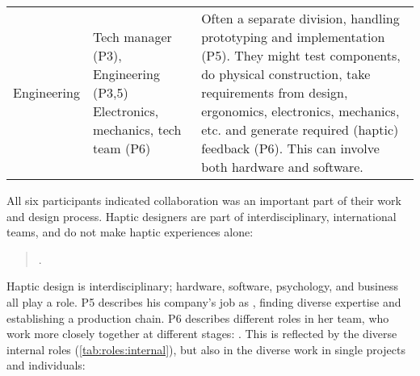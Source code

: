 \begin{table}[tbp]
{\begin{tabular}{p{0.5in}p{1.1in}p{2.75in}}
        
        Engineering 
            &
            Tech manager (P3), \newline
            Engineering (P3,5) \newline
            Electronics, mechanics, tech team (P6) \newline
            & Often a separate division, handling prototyping and implementation (P5).
            They might test components, do %
            physical construction, take requirements from design, ergonomics, electronics, mechanics, etc. and generate required (haptic) feedback (P6).
            This can involve both hardware and software.
            \\ %
      \end{tabular}}
    \end{table}
    
All six participants indicated collaboration was an important part of their work and design process.
Haptic designers are part of interdisciplinary, international teams, and do not make haptic experiences alone:

\begin{quote}
    .
\end{quote}


Haptic design is interdisciplinary; hardware, software, psychology, and business all play a role.
P5 describes his company's job as , finding diverse expertise and establishing a production chain.
P6 describes different roles in her team, who work more closely together at different stages: .
This is reflected by the diverse internal roles (\autoref{tab:roles:internal}), but also in the diverse work in single projects and individuals:

